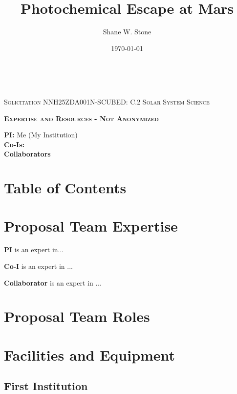 \documentclass[oneside,12pt]{article}
\author{Shane W. Stone}
\title{Photochemical Escape at Mars}
\date{\today}
\makeatletter
\newcommand{\printtitle}{\@title}
\makeatother
\begin{document}
    \pagestyle{scrheadings}

    \begin{center}

        \textsc{\textbf{\printtitle}}\\

        \bigskip

        \textsc{Solicitation NNH25ZDA001N-SCUBED: C.2 Solar System Science}\\

        \bigskip

        \textsc{\textbf{Expertise and Resources - Not Anonymized}}

    \end{center}

    \noindent\textbf{PI:} Me (My Institution)\\
    \textbf{Co-Is:}\\
    \textbf{Collaborators}\\


    \section{Table of Contents}
    \renewcommand\contentsname{}
    \tableofcontents
    \thispagestyle{scrheadings}

    \clearpage


    \section{Proposal Team Expertise}

    \textbf{PI } is an expert in...

    \textbf{Co-I } is an expert in ...

    \textbf{Collaborator } is an expert in ...


    \section{Proposal Team Roles}

    \clearpage


    \section{Facilities and Equipment}
    \label{sec:facilities}

    \subsection{First Institution}
\end{document}
